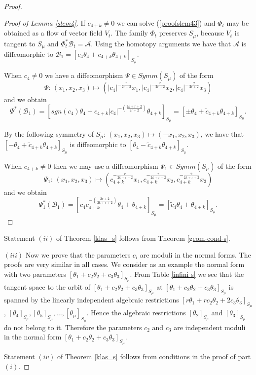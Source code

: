 \documentclass{amsart}
\theoremstyle{definition}
\numberwithin{equation}{section}
\begin{document}
\begin{proof}
\begin{proof}[Proof of Lemma \ref{slem4}]
\noindent If \;$ c_{4+k}\ne 0$ we can solve (\ref{proofslem43}) and $\Phi_t$ may be obtained as a flow of vector field $V_t$.
The family $\Phi_t$ preserves $S_{\mu}$, because $V_t$ is tangent to $S_{\mu}$ and $\Phi_t^*\mathcal{B}_t=\mathcal{A}$.
Using the homotopy arguments we have that $\mathcal{A}$ is diffeomorphic to $ \mathcal{B}_1=[c_4 \theta_4+c_{4+k} \theta_{4+k}]_{S_{\mu}}$.

\bigskip

When $c_4\ne 0$ we have a diffeomorphism $\Psi \in Symm(S_{\mu})$ of the form
  \begin{equation}
\label{proofslem44}
\Psi:\,(x_1,x_2,x_3)\mapsto (|c_4|^{-\frac{r}{2r+2}} x_1,|c_4|^{-\frac{r}{2r+2}} x_2,|c_4|^{-\frac{2}{2r+2}} x_3)
\end{equation}
and we obtain
\[ \Psi^*(\mathcal{B}_1)=[sgn(c_4)\theta_4+c_{4+k} |c_4|^{-(\frac{2k+r+2}{2r+2})} \theta_{4+k}]_{S_{\mu}} =
 [ \pm\theta_4+ \widetilde{c}_{4+k} \theta_{4+k}]_{S_{\mu}}.\]

 \noindent By the following symmetry of $S_{\mu}$: $(x_1,x_2,x_3)\mapsto (-x_1, x_2, x_3)$, we have that
 $[ -\theta_4+\widetilde{c}_{4+k} \theta_{4+k}]_{S_{\mu}}$ is diffeomorphic to $[ \theta_4-\widetilde{c}_{4+k} \theta_{4+k}]_{S_{\mu}}$.

 \bigskip

  When $c_{4+k}\ne0$ then  we may use a diffeomorphism $\Psi_1\in Symm(S_{\mu})$ of the form
  \begin{equation}
\label{proofslem45}
\Psi_1:\,(x_1,x_2,x_3)\mapsto (c_{4+k}^{-\frac{r}{2k+r+2}} x_1,c_{4+k}^{-\frac{r}{2k+r+2}} x_2,c_{4+k}^{-\frac{2}{2k+r+2}} x_3)
\end{equation}
and we obtain
\[ \Psi_1^*(\mathcal{B}_1)=[c_4 c_{4+k}^{-(\frac{2r+2}{2k+r+2})}\theta_4 + \theta_{4+k}]_{S_{\mu}}=[ \widetilde{c}_4\theta_4+\theta_{4+k}]_{S_{\mu}}.\]

 \end{proof}

Statement $(ii)$ of Theorem \ref{klas_s} follows   from Theorem \ref{geom-cond-s}.

 \bigskip

$(iii)$ Now we prove that the parameters $c_i$ are moduli in the normal forms. The proofs are very similar in all cases. We consider as an example
the normal form with two parameters $[\theta_1+c_2\theta_2+c_3\theta_3]_{S_{\mu}}$. From Table \ref{infini s} we see that the tangent space to the orbit
of $[\theta_1+c_2\theta_2+c_3\theta_3]_{S_{\mu}}$ at $[\theta_1+c_2\theta_2+c_3\theta_3]_{S_{\mu}}$ is spanned by the linearly independent algebraic restrictions
$[r\theta_1+rc_2\theta_2+2c_3\theta_3]_{S_{\mu}}$, $[\theta_4]_{S_{\mu}},[\theta_5]_{S_{\mu}}, \ldots, [\theta_{\mu}]_{S_{\mu}}.$ Hence the algebraic restrictions
$[\theta_2]_{S_{\mu}}$ and $[\theta_3]_{S_{\mu}}$ do not belong to it. Therefore the parameters $c_2$ and $c_3$ are independent moduli in the normal form
$[\theta_1+c_2\theta_2+c_3\theta_3]_{S_{\mu}}$.

\medskip

Statement $(iv)$ of Theorem \ref{klas_s} follows from conditions
in the proof of part $(i)$. 

\end{proof}
\end{document}
